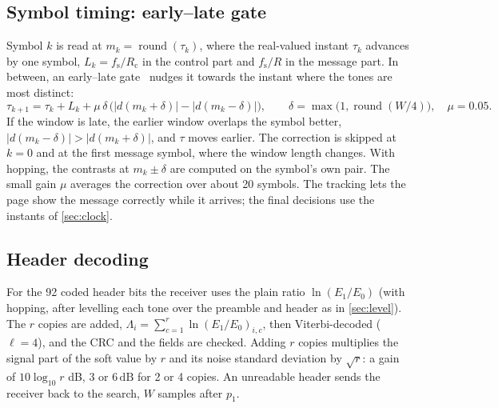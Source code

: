 \documentclass[11pt,a4paper]{article}
\newcommand{\dB}{\,\mathrm{dB}}
\newcommand{\round}[1]{\operatorname{round}\!\left(#1\right)}
\newcommand{\fs}{f_{\mathrm{s}}}
\newcommand{\Rc}{R_{\mathrm{c}}}
\theoremstyle{remark}
\begin{document}
\subsection{Symbol timing: early--late gate}
\label{sec:track}
Symbol $k$ is read at $m_k = \round{\tau_k}$, where the real-valued instant $\tau_k$ advances by one symbol, $L_k = \fs/\Rc$ in the control part and $\fs/R$ in the message part. In between, an early--late gate~\cite{proakis,mengali} nudges it towards the instant where the tones are most distinct:
\begin{equation}
\tau_{k+1} = \tau_k + L_k + \mu\,\delta\,\bigl( |d(m_k + \delta)| - |d(m_k - \delta)| \bigr), \qquad \delta = \max\bigl(1, \round{W/4}\bigr), \quad \mu = 0.05 .
\end{equation}
If the window is late, the earlier window overlaps the symbol better, $|d(m_k - \delta)| > |d(m_k + \delta)|$, and $\tau$ moves earlier. The correction is skipped at $k = 0$ and at the first message symbol, where the window length changes. With hopping, the contrasts at $m_k \pm \delta$ are computed on the symbol's own pair. The small gain $\mu$ averages the correction over about 20 symbols. The tracking lets the page show the message correctly while it arrives; the final decisions use the instants of \cref{sec:clock}.

\subsection{Header decoding}
\label{sec:hdrdec}
For the 92 coded header bits the receiver uses the plain ratio $\ln(E_1/E_0)$ (with hopping, after levelling each tone over the preamble and header as in \cref{sec:level}). The $r$ copies are added, $\Lambda_i = \sum_{c=1}^{r} \ln(E_1/E_0)_{i,c}$, then Viterbi-decoded ($\ell = 4$), and the CRC and the fields are checked. Adding $r$ copies multiplies the signal part of the soft value by $r$ and its noise standard deviation by $\sqrt r$: a gain of $10\log_{10} r$ dB, 3 or $6\dB$ for 2 or 4 copies. An unreadable header sends the receiver back to the search, $W$ samples after $p_1$.
\end{document}

